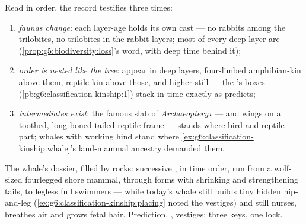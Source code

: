 \begin{proposition}\label{prop:g9:evidence-of-evolution:record}
Read in order, the record testifies three times:
\begin{enumerate}
  \item \emph{faunas change}: each layer-age holds its own
        cast --- no rabbits among the trilobites, no
        trilobites in the rabbit layers; most  of
        every deep layer are \emph{}
        (\cref{prop:g5:biodiversity:loss}'s word, with
        deep time behind it);
  \item \emph{order is nested like the tree}:  appear
        in deep layers, four-limbed amphibian-kin above
        them, reptile-kin above those,  and 
        higher still --- the 's boxes
        (\cref{pb:g6:classification-kinship:1}) stack in
        time exactly as  predicts;
  \item \emph{intermediates exist}: the famous slab of
        \emph{Archaeopteryx} ---  and wings on a
        toothed, long-boned-tailed reptile frame ---
        stands where bird and reptile  part; 
        whales with working hind  stand where
        \cref{ex:g6:classification-kinship:whale}'s
        land-mammal ancestry demanded them.
\end{enumerate}
\end{proposition}
\admitted

\begin{example}\label{ex:g9:evidence-of-evolution:whales}
The whale's dossier, filled by rocks: successive ,
in time order, run from a wolf-sized fourlegged shore
mammal, through forms with shrinking  and
strengthening tails, to legless full swimmers --- while
today's whale still builds tiny hidden hip-and-leg 
(\cref{ex:g6:classification-kinship:placing} noted the
vestiges) and still nurses, breathes air and grows fetal
hair. Prediction, , vestiges: three keys, one
lock.
\end{example}


